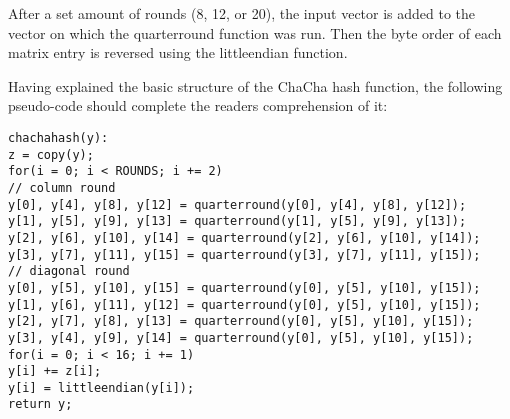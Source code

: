 \noindent After a set amount of rounds (8, 12, or 20), the input vector is added to the vector on which the quarterround function was run. Then the byte order of each matrix entry is reversed using the littleendian function.

Having explained the basic structure of the ChaCha hash function, the following pseudo-code should complete the readers comprehension of it:

\begin{center}
\begin{minipage}{\linewidth}
\texttt{chachahash(y):} \\
\hspace*{1em}\texttt{z = copy(y);}\\
\hspace*{1em}\texttt{for(i = 0; i < ROUNDS; i += 2)}\\
\hspace*{2em}\texttt{// column round}\\
\hspace*{2em}\texttt{y[0], y[4], y[8], y[12] = quarterround(y[0], y[4], y[8], y[12]);}\\
\hspace*{2em}\texttt{y[1], y[5], y[9], y[13] = quarterround(y[1], y[5], y[9], y[13]);}\\
\hspace*{2em}\texttt{y[2], y[6], y[10], y[14] = quarterround(y[2], y[6], y[10], y[14]);}\\
\hspace*{2em}\texttt{y[3], y[7], y[11], y[15] = quarterround(y[3], y[7], y[11], y[15]);}\\
\hspace*{2em}\texttt{// diagonal round}\\
\hspace*{2em}\texttt{y[0], y[5], y[10], y[15] = quarterround(y[0], y[5], y[10], y[15]);}\\
\hspace*{2em}\texttt{y[1], y[6], y[11], y[12] = quarterround(y[0], y[5], y[10], y[15]);}\\
\hspace*{2em}\texttt{y[2], y[7], y[8], y[13] = quarterround(y[0], y[5], y[10], y[15]);}\\
\hspace*{2em}\texttt{y[3], y[4], y[9], y[14] = quarterround(y[0], y[5], y[10], y[15]);}\\
\hspace*{1em}\texttt{for(i = 0; i < 16; i += 1)}\\
\hspace*{2em}\texttt{y[i] += z[i];}\\
\hspace*{2em}\texttt{y[i] = littleendian(y[i]);}\\
\hspace*{1em}\texttt{return y;}
\end{minipage}
\end{center}

